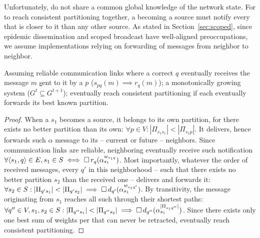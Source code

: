 Unfortunately, \processes do not share a common global knowledge of
the network state. For \processes to reach consistent partitioning
together, a \process becoming a source must notify every \process that
is closer to it than any other source. As stated in
Section~\ref{sec:scoped}, since epidemic dissemination and scoped
broadcast have well-aligned preoccupations, we assume implementations
relying on forwarding of messages from neighbor to neighbor. 

\begin{theorem}
%
Assuming reliable communication links where a correct \process $q$
eventually receives the message $m$ \underline{s}ent to it by a
\process $p$ ($s_{pq}(m) \implies r_{q}(m)$); a monotonically growing
system ($G^t \subseteq G^{t+1}$); \processes eventually reach
consistent partitioning if each \process eventually forwards its best
known partition.
\end{theorem}

\begin{proof}
  When a \process $s_1$ becomes a source, it belongs to its own
  partition, for there exists no better partition than its own:
  $\forall p \in V: |\Pi_{s_1 s_1}| < |\Pi_{s_1 p}|$. It delivers,
  hence forwards such $\alpha$ message to its -- current or future --
  neighbors. Since communication links are reliable, neighboring
  \processes eventually receive such notification $\forall \langle
  s_1, q \rangle \in E, s_1 \in S \iff \square\,
  r_q(\alpha_{s_1}^{w_{s_1 q}})$. Most importantly, whatever the order
  of received messages, every \process $q'$ in this neighborhood --
  such that there exists no better partition $s_2$ than the received
  one -- delivers and forwards it: $\forall s_2 \in S: |\Pi_{q' s_1}|
  < |\Pi_{q' s_2}| \implies \square\, d_{q'}(\alpha_{s_1}^{w_{s_1
      q'}})$. By transitivity, the message originating from $s_1$
  reaches all such \processes through their shortest paths: $\forall
  q'' \in V, s_1, s_2 \in S: |\Pi_{q'' s_1}| < |\Pi_{q'' s_2}|
  \implies \square\, d_{q''}(\alpha_{s_1}^{|\Pi_{s_1 q''}|})$.
  Since there exists only one best sum of weights per \process that
  can never be retracted, \processes eventually reach consistent
  partitioning.
\end{proof}

